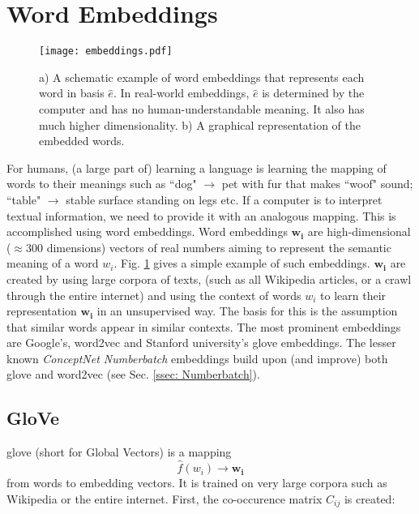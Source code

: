 \section{Word Embeddings \label{ssec: word embeddings}}

    \begin{figure}
        \centering
        \texttt{[image: embeddings.pdf]}
        \caption{a) A schematic example of word \glspl{embedding} that represents each word in basis $\hat{e}$. In real-world embeddings, $\hat{e}$ is determined by the computer and has no human-understandable meaning. It also has much higher dimensionality. b) A graphical representation of the embedded words.}
        \label{fig:word embedding}
    \end{figure}
    
    For humans, (a large part of) learning a language is learning the mapping of words to their meanings such as ``dog" $\rightarrow$ pet with fur that makes ``woof" sound; ``table" $\rightarrow$ stable surface standing on legs etc. If a computer is to interpret textual information, we need to provide it with an analogous mapping. This is accomplished using word embeddings.
    Word \glspl{embedding} $\mathbf{w_i}$ are high-dimensional ($\approx 300$ dimensions) vectors of real numbers aiming to represent the semantic meaning of a word $w_i$. Fig. \ref{fig:word embedding} gives a simple example of such \glspl{embedding}. $\mathbf{w_i}$ are created by using large corpora of texts, (such as all Wikipedia articles, or a crawl through the entire internet) and using the context of words $w_i$ to learn their representation $\mathbf{w_i}$ in an unsupervised way. The basis for this is the assumption that similar words appear in similar contexts\cite{word2vec}. 
    The most prominent embeddings are Google's, word2vec\cite{word2vec} and Stanford university's \gls{glove}\cite{glove} \glspl{embedding}. The lesser known \textit{ConceptNet Numberbatch} \glspl{embedding}\cite{conceptnet} build upon (and improve) both \gls{glove} and word2vec (see Sec. \ref{ssec: Numberbatch}).
    
    \subsection{GloVe \label{ssec: Glove}}
        \gls{glove}\cite{glove} (short for Global Vectors) is a mapping 
        \[ \hat{f}(w_i) \rightarrow \mathbf{w_i}\] 
        from words to \gls{embedding} vectors. It is trained on very large corpora such as Wikipedia or the entire internet. First, the co-occurence matrix $C_{ij}$ is created:
        
